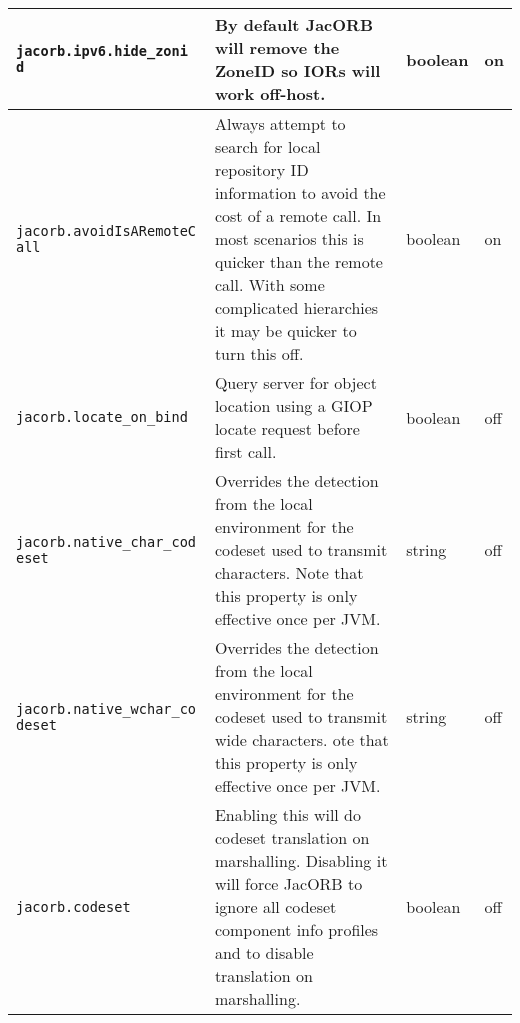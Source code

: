 \begin{small}
\begin{longtable}{|p{5cm}|p{7.5cm}|p{1.5cm}|p{1.5cm}|}
\hline
\verb"jacorb.ipv6.hide_zoni"
\verb"d" &
By default JacORB will remove the ZoneID so IORs will work off-host. & boolean & on\\
\hline
\verb"jacorb.avoidIsARemoteC"
\verb"all" & Always attempt to search for local repository ID information to avoid
the cost of a remote call. In most scenarios this is quicker than the remote call.
With some complicated hierarchies it may be quicker to turn this off. & boolean & on\\
\hline
\verb"jacorb.locate_on_bind " & Query server for object location using a GIOP locate
request before first call. & boolean & off\\
\hline
\verb"jacorb.native_char_cod"
\verb"eset" & Overrides the detection from the local environment for the codeset
used to transmit characters. Note that this property is only effective once per
JVM. & string & off\\
\hline
\verb"jacorb.native_wchar_co"
\verb"deset" & Overrides the detection from the local environment for the codeset
used to transmit wide characters. ote that this property is only effective once per
JVM. & string & off\\
\hline
\verb"jacorb.codeset" &
Enabling this will do codeset translation on marshalling. Disabling it will force
JacORB to ignore all codeset component info profiles and to disable translation on
marshalling. & boolean & off\\
\hline
\end{longtable}
\end{small}

